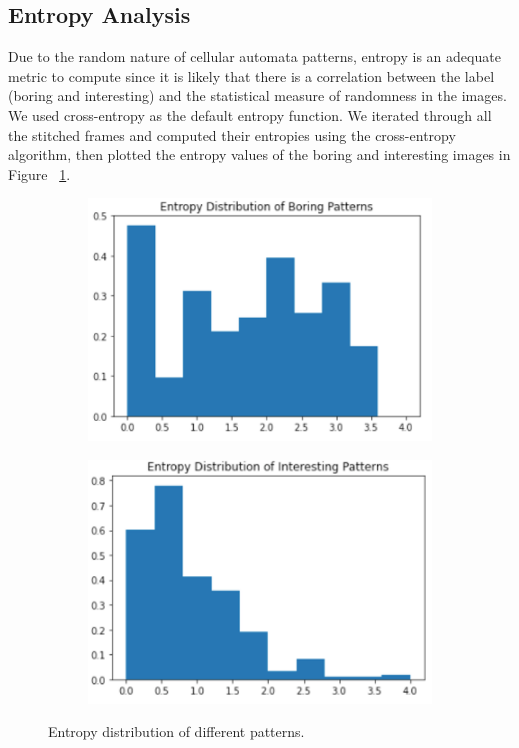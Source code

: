 \documentclass[12pt]{article}
\numberwithin{figure}{section} %
\begin{document}
\subsection{Entropy Analysis}
Due to the random nature of cellular automata patterns, entropy is an adequate metric to compute since it is likely that there is a correlation between the label (boring and interesting) and the statistical measure of randomness in the images. We used cross-entropy as the default entropy function. We iterated through all the stitched frames and computed their entropies using the cross-entropy algorithm, then plotted the entropy values of the boring and interesting images in Figure ~\ref{fig:entropy distribution}. 
\begin{figure}[H]
	\begin{subfigure}{0.5 \textwidth}
		\centering
		\includegraphics[width=\linewidth]{Section3/4.1}
	\end{subfigure}
	\begin{subfigure}{0.5 \textwidth}
		\centering
		\includegraphics[width=\linewidth]{Section3/4.2}
	\end{subfigure}
	\caption[Entropy distribution of patterns]{Entropy distribution of different patterns.}
	\label{fig:entropy distribution}
	\vspace{-1.5em}
\end{figure}
\end{document}
